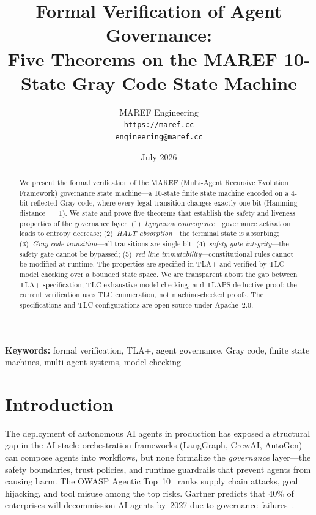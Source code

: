 \documentclass[11pt]{article}
\title{Formal Verification of Agent Governance:\\
Five Theorems on the MAREF 10-State Gray Code State Machine}
\author{
  MAREF Engineering \\
  \texttt{https://maref.cc} \\
  \texttt{engineering@maref.cc}
}
\date{July 2026}
\begin{document}
\maketitle

\begin{abstract}
We present the formal verification of the MAREF (Multi-Agent Recursive Evolution
Framework) governance state machine---a 10-state finite state machine encoded on
a 4-bit reflected Gray code, where every legal transition changes exactly one
bit (Hamming distance~$=1$). We state and prove five theorems that establish
the safety and liveness properties of the governance layer: (1)~\emph{Lyapunov
convergence}---governance activation leads to entropy decrease; (2)~\emph{HALT
absorption}---the terminal state is absorbing; (3)~\emph{Gray code
transition}---all transitions are single-bit; (4)~\emph{safety gate
integrity}---the safety gate cannot be bypassed; (5)~\emph{red line
immutability}---constitutional rules cannot be modified at runtime. The
properties are specified in TLA+ and verified by TLC model checking over a
bounded state space. We are transparent about the gap between TLA+
specification, TLC exhaustive model checking, and TLAPS deductive proof: the
current verification uses TLC enumeration, not machine-checked proofs. The
specifications and TLC configurations are open source under Apache~2.0.
\end{abstract}

\textbf{Keywords:} formal verification, TLA+, agent governance, Gray code,
finite state machines, multi-agent systems, model checking

\section{Introduction}

The deployment of autonomous AI agents in production has exposed a structural
gap in the AI stack: orchestration frameworks (LangGraph, CrewAI, AutoGen) can
compose agents into workflows, but none formalize the \emph{governance} layer---the
safety boundaries, trust policies, and runtime guardrails that prevent agents
from causing harm. The OWASP Agentic Top~10~\cite{owasp-agentic} ranks supply
chain attacks, goal hijacking, and tool misuse among the top risks. Gartner
predicts that 40\% of enterprises will decommission AI agents by~2027 due to
governance failures~\cite{gartner-2026}.
\end{document}
